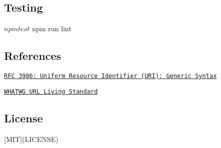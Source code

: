 \subsection*{Testing}


\begin{DoxyCode}
$ npm test
$ npm run lint
\end{DoxyCode}


\subsection*{References}


\begin{DoxyItemize}
\item \href{https://tools.ietf.org/html/rfc3986}{\tt R\+FC 3986\+: Uniform Resource Identifier (U\+RI)\+: Generic Syntax}
\item \href{https://url.spec.whatwg.org/}{\tt W\+H\+A\+T\+WG U\+RL Living Standard}
\end{DoxyItemize}

\subsection*{License}

\mbox{[}M\+IT\mbox{]}(L\+I\+C\+E\+N\+SE) 